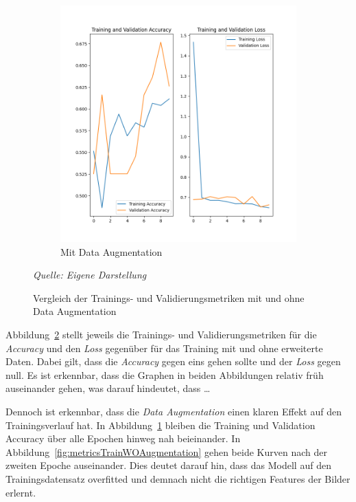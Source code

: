 \begin{figure}[H]
\begin{subfigure}[b]{0.49\textwidth}
        \includegraphics[width=\textwidth]{abbildungen/loss_train_val.png}
        \caption{Mit Data Augmentation}\label{fig:metricsTrainWAugmentation}
    \end{subfigure}
    \caption{Vergleich der Trainings- und Validierungsmetriken mit und ohne Data Augmentation}\label{fig:metricsTrain}
    \textit{Quelle: Eigene Darstellung}
    \\
\end{figure}
Abbildung~\ref{fig:metricsTrain} stellt jeweils die Trainings- und Validierungsmetriken für die \textit{Accuracy} und den \textit{Loss} gegenüber für das Training mit und ohne erweiterte Daten.
Dabei gilt, dass die \textit{Accuracy} gegen eins gehen sollte und der \textit{Loss} gegen null.
Es ist erkennbar, dass die Graphen in beiden Abbildungen relativ früh auseinander gehen, was darauf hindeutet, dass \ldots

Dennoch ist erkennbar, dass die \textit{Data Augmentation} einen klaren Effekt auf den Trainingsverlauf hat. In Abbildung~\ref{fig:metricsTrainWAugmentation} bleiben die Training und Validation Accuracy über alle Epochen hinweg nah beieinander.
In Abbildung~\ref{fig:metricsTrainWOAugmentation} gehen beide Kurven nach der zweiten Epoche auseinander. Dies deutet darauf hin, dass das Modell auf den Trainingsdatensatz overfitted und demnach nicht die richtigen Features der Bilder erlernt.

